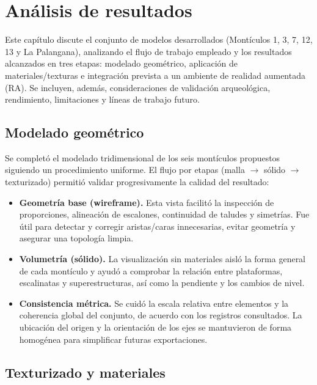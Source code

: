 
\section{Análisis de resultados}

Este capítulo discute el conjunto de modelos desarrollados (Montículos 1, 3, 7, 12, 13 y La Palangana), analizando el flujo de trabajo empleado y los resultados alcanzados en tres etapas: modelado geométrico, aplicación de materiales/texturas e integración prevista a un ambiente de realidad aumentada (RA). Se incluyen, además, consideraciones de validación arqueológica, rendimiento, limitaciones y líneas de trabajo futuro.

\subsection{Modelado geométrico}

Se completó el modelado tridimensional de los seis montículos propuestos siguiendo un procedimiento uniforme. El flujo por etapas (malla $\rightarrow$ sólido $\rightarrow$ texturizado) permitió validar progresivamente la calidad del resultado:
\begin{itemize}
    \item \textbf{Geometría base (wireframe).} Esta vista facilitó la inspección de proporciones, alineación de escalones, continuidad de taludes y simetrías. Fue útil para detectar y corregir aristas/caras innecesarias, evitar geometría y asegurar una topología limpia.
    \item \textbf{Volumetría (sólido).} La visualización sin materiales aisló la forma general de cada montículo y ayudó a comprobar la relación entre plataformas, escalinatas y superestructuras, así como la pendiente y los cambios de nivel.
    \item \textbf{Consistencia métrica.} Se cuidó la escala relativa entre elementos y la coherencia global del conjunto, de acuerdo con los registros consultados. La ubicación del origen y la orientación de los ejes se mantuvieron de forma homogénea para simplificar futuras exportaciones.
\end{itemize}

\subsection{Texturizado y materiales}

